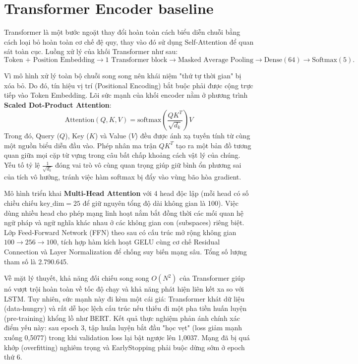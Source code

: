\documentclass[12pt]{report}
\begin{document}
\section{Transformer Encoder baseline}

Transformer \cite{vaswani2017attention} là một bước ngoặt thay đổi hoàn toàn cách biểu diễn chuỗi bằng cách loại bỏ hoàn toàn cơ chế đệ quy, thay vào đó sử dụng Self-Attention để quan sát toàn cục. Luồng xử lý của khối Transformer như sau:
\[
\text{Token + Position Embedding}
\rightarrow \text{1 Transformer block}
\rightarrow \text{Masked Average Pooling}
\rightarrow \text{Dense}(64)
\rightarrow \text{Softmax}(5).
\]

Vì mô hình xử lý toàn bộ chuỗi song song nên khái niệm "thứ tự thời gian" bị xóa bỏ. Do đó, tín hiệu vị trí (Positional Encoding) bắt buộc phải được cộng trực tiếp vào Token Embedding. Lõi sức mạnh của khối encoder nằm ở phương trình \textbf{Scaled Dot-Product Attention}:
\begin{equation}
\text{Attention}(Q,K,V) = \text{softmax}\left(\frac{QK^T}{\sqrt{d_k}}\right)V
\end{equation}
Trong đó, Query ($Q$), Key ($K$) và Value ($V$) đều được ánh xạ tuyến tính từ cùng một nguồn biểu diễn đầu vào. Phép nhân ma trận $QK^T$ tạo ra một bản đồ tương quan giữa mọi cặp từ vựng trong câu bất chấp khoảng cách vật lý của chúng. Yếu tố tỷ lệ $\frac{1}{\sqrt{d_k}}$ đóng vai trò vô cùng quan trọng giúp giữ bình ổn phương sai của tích vô hướng, tránh việc hàm softmax bị đẩy vào vùng bão hòa gradient.

Mô hình triển khai \textbf{Multi-Head Attention} với 4 head độc lập (mỗi head có số chiều chiếu $\text{key\_dim} = 25$ để giữ nguyên tổng độ dài không gian là 100). Việc dùng nhiều head cho phép mạng linh hoạt nắm bắt đồng thời các mối quan hệ ngữ pháp và ngữ nghĩa khác nhau ở các không gian con (subspaces) riêng biệt. Lớp Feed-Forward Network (FFN) theo sau có cấu trúc mở rộng không gian $100\rightarrow256\rightarrow100$, tích hợp hàm kích hoạt GELU cùng cơ chế Residual Connection và Layer Normalization để chống suy biến mạng sâu. Tổng số lượng tham số là 2.790.645.

Về mặt lý thuyết, khả năng đối chiếu song song $O(N^2)$ của Transformer giúp nó vượt trội hoàn toàn về tốc độ chạy và khả năng phát hiện liên kết xa so với LSTM. Tuy nhiên, sức mạnh này đi kèm một cái giá: Transformer khát dữ liệu (data-hungry) và rất dễ học lệch cấu trúc nếu thiếu đi một pha tiền huấn luyện (pre-training) khổng lồ như BERT. Kết quả thực nghiệm phản ánh chính xác điểm yếu này: sau epoch 3, tập huấn luyện bắt đầu "học vẹt" (loss giảm mạnh xuống 0,5077) trong khi validation loss lại bật ngược lên 1,0037. Mạng đã bị quá khớp (overfitting) nghiêm trọng và EarlyStopping phải buộc dừng sớm ở epoch thứ 6.
\end{document}
